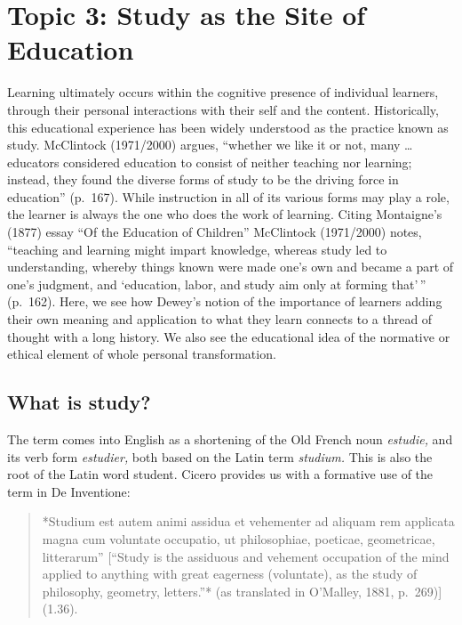 \documentclass[
]{book}
\begin{document}
\hypertarget{topic-3-study-as-the-site-of-education}{%
\section*{Topic 3: Study as the Site of Education}\label{topic-3-study-as-the-site-of-education}}

Learning ultimately occurs within the cognitive presence of individual learners, through their personal interactions with their self and the content. Historically, this educational experience has been widely understood as the practice known as study. McClintock (1971/2000) argues, ``whether we like it or not, many \ldots{} educators considered education to consist of neither teaching nor learning; instead, they found the diverse forms of study to be the driving force in education'' (p.~167). While instruction in all of its various forms may play a role, the learner is always the one who does the work of learning. Citing Montaigne's (1877) essay ``Of the Education of Children'' McClintock (1971/2000) notes, ``teaching and learning might impart knowledge, whereas study led to understanding, whereby things known were made one's own and became a part of one's judgment, and `education, labor, and study aim only at forming that'\,'' (p.~162). Here, we see how Dewey's notion of the importance of learners adding their own meaning and application to what they learn connects to a thread of thought with a long history. We also see the educational idea of the normative or ethical element of whole personal transformation.

\hypertarget{what-is-study}{%
\subsection*{What is study?}\label{what-is-study}}

The term comes into English as a shortening of the Old French noun \emph{estudie,} and its verb form \emph{estudier,} both based on the Latin term \emph{studium.} This is also the root of the Latin word student. Cicero provides us with a formative use of the term in De Inventione:

\begin{quote}
*Studium est autem animi assidua et vehementer ad aliquam rem applicata magna cum voluntate occupatio, ut philosophiae, poeticae, geometricae, litterarum'' {[}``Study is the assiduous and vehement occupation of the mind applied to anything with great eagerness (voluntate), as the study of philosophy, geometry, letters.''* (as translated in O'Malley, 1881, p.~269){]} (1.36).
\end{quote}
\end{document}

